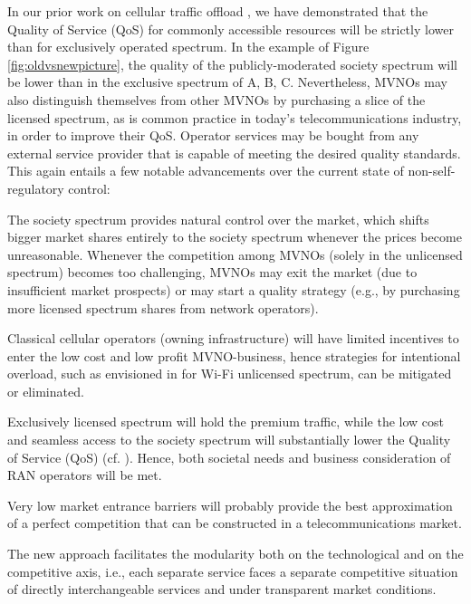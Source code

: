 \documentclass[conference]{IEEEtran}
\begin{document}
In our prior work on cellular traffic offload \cite{zwickl2013wi}, we have demonstrated that the Quality of Service (QoS) for commonly accessible resources will be strictly lower than for exclusively operated spectrum. In the example of Figure \ref{fig:oldvsnewpicture}, the quality of the publicly-moderated society spectrum will be lower than in the exclusive spectrum of A, B, C. Nevertheless, MVNOs may also distinguish themselves from other MVNOs by purchasing a slice of the licensed spectrum, as is common practice in today's telecommunications industry, in order to improve their QoS. Operator services may be bought from any external service provider that is capable of meeting the desired quality standards. This again entails a few notable advancements over the current state of non-self-regulatory control:
	\begin{inparaenum}
		\item The society spectrum provides natural control over the market, which shifts bigger market shares entirely to the society spectrum whenever the prices become unreasonable. Whenever the competition among MVNOs (solely in the unlicensed spectrum) becomes too challenging, MVNOs may exit the market (due to insufficient market prospects) or may start a quality strategy (e.g., by purchasing more licensed spectrum shares from network operators).
		\item Classical cellular operators (owning infrastructure) will have limited incentives to enter the low cost and low profit MVNO-business, hence strategies for intentional overload, such as envisioned in \cite{zwickl2013wi} for Wi-Fi unlicensed spectrum, can be mitigated or eliminated.
		\item Exclusively licensed spectrum will hold the premium traffic, while the low cost and seamless access to the society spectrum will substantially lower the Quality of Service (QoS) (cf. \cite{zwickl2013wi}). Hence, both societal needs and business consideration of RAN operators will be met.
		\item Very low market entrance barriers will probably provide the best approximation of a perfect competition that can be constructed in a telecommunications market.
		\item The new approach facilitates the modularity both on the technological and on the competitive axis, i.e., each separate service faces a separate competitive situation of directly interchangeable services and under transparent market conditions.
	\end{inparaenum}
	
\end{document}
